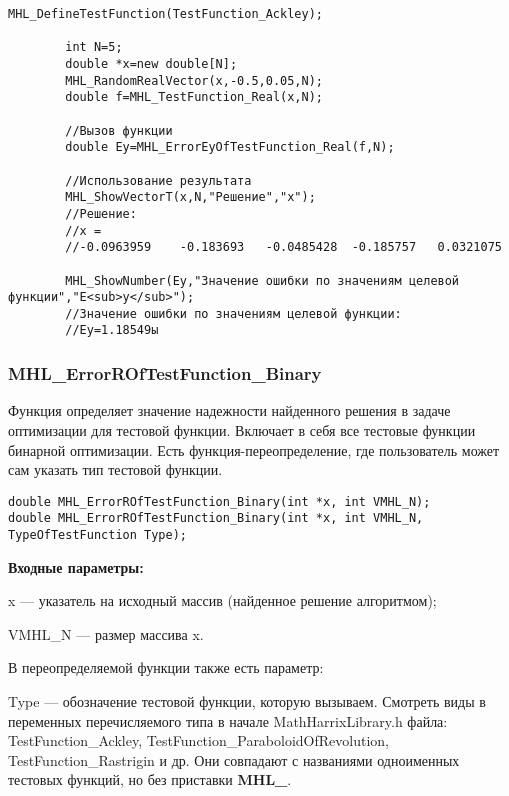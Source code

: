 \documentclass[a4paper,12pt]{article}
\begin{document}
\begin{lstlisting}[label=code_use_MHL_ErrorEyOfTestFunction_Real,caption=Пример использования]
        MHL_DefineTestFunction(TestFunction_Ackley);

        int N=5;
        double *x=new double[N];
        MHL_RandomRealVector(x,-0.5,0.05,N);
        double f=MHL_TestFunction_Real(x,N);

        //Вызов функции
        double Ey=MHL_ErrorEyOfTestFunction_Real(f,N);

        //Использование результата
        MHL_ShowVectorT(x,N,"Решение","x");
        //Решение:
        //x =
        //-0.0963959	-0.183693	-0.0485428	-0.185757	0.0321075

        MHL_ShowNumber(Ey,"Значение ошибки по значениям целевой функции","E<sub>y</sub>");
        //Значение ошибки по значениям целевой функции:
        //Ey=1.18549ы
\end{lstlisting}

\subsubsection{MHL\_ErrorROfTestFunction\_Binary}\label{MHL_ErrorROfTestFunction_Binary}

Функция определяет значение надежности найденного решения в задаче оптимизации для тестовой функции. Включает в себя все тестовые функции бинарной оптимизации. Есть функция-переопределение, где пользователь может сам указать тип тестовой функции.


\begin{lstlisting}[label=code_syntax_MHL_ErrorROfTestFunction_Binary,caption=Синтаксис]
double MHL_ErrorROfTestFunction_Binary(int *x, int VMHL_N);
double MHL_ErrorROfTestFunction_Binary(int *x, int VMHL_N, TypeOfTestFunction Type);
\end{lstlisting}

\textbf{Входные параметры:}

x --- указатель на исходный массив (найденное решение алгоритмом);

VMHL\_N --- размер массива x.

В переопределяемой функции также есть параметр:
  
Type --- обозначение тестовой функции, которую вызываем.
Смотреть виды в переменных перечисляемого типа в начале MathHarrixLibrary.h файла: TestFunction\_Ackley, TestFunction\_ParaboloidOfRevolution, TestFunction\_Rastrigin и др. Они совпадают с названиями одноименных тестовых функций, но без приставки \textbf{MHL\_}.
\end{document}
